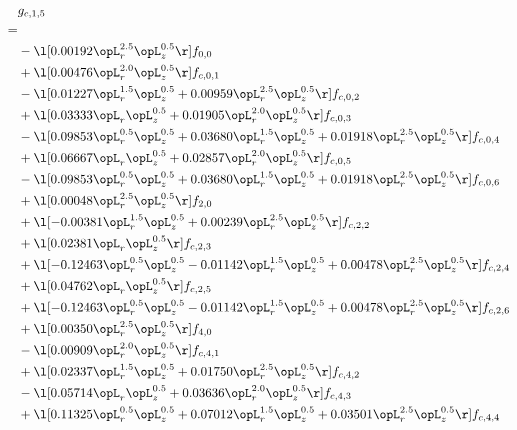 \begin{alignat}{2} 
\label{eq:g_15_0} 
& g_{c,1,5} \nonumber \\ 
 = \\ 
& - \l[  0.00192 \opL_r^{2.5} \opL_z^{0.5}  \r] f_{0,0} \nonumber \\ 
& + \l[  0.00476 \opL_r^{2.0} \opL_z^{0.5}  \r] f_{c,0,1} \nonumber \\ 
& - \l[  0.01227 \opL_r^{1.5} \opL_z^{0.5} +  0.00959 \opL_r^{2.5} \opL_z^{0.5}  \r] f_{c,0,2} \nonumber \\ 
& + \l[  0.03333 \opL_r \opL_z^{0.5} +  0.01905 \opL_r^{2.0} \opL_z^{0.5}  \r] f_{c,0,3} \nonumber \\ 
& - \l[  0.09853 \opL_r^{0.5} \opL_z^{0.5} +  0.03680 \opL_r^{1.5} \opL_z^{0.5} +  0.01918 \opL_r^{2.5} \opL_z^{0.5}  \r] f_{c,0,4} \nonumber \\ 
& + \l[  0.06667 \opL_r \opL_z^{0.5} +  0.02857 \opL_r^{2.0} \opL_z^{0.5}  \r] f_{c,0,5} \nonumber \\ 
& - \l[  0.09853 \opL_r^{0.5} \opL_z^{0.5} +  0.03680 \opL_r^{1.5} \opL_z^{0.5} +  0.01918 \opL_r^{2.5} \opL_z^{0.5}  \r] f_{c,0,6} \nonumber \\ 
& + \l[  0.00048 \opL_r^{2.5} \opL_z^{0.5}  \r] f_{2,0} \nonumber \\ 
& + \l[  -0.00381 \opL_r^{1.5} \opL_z^{0.5} +  0.00239 \opL_r^{2.5} \opL_z^{0.5}  \r] f_{c,2,2} \nonumber \\ 
& + \l[  0.02381 \opL_r \opL_z^{0.5}  \r] f_{c,2,3} \nonumber \\ 
& + \l[  -0.12463 \opL_r^{0.5} \opL_z^{0.5}   -0.01142 \opL_r^{1.5} \opL_z^{0.5} +  0.00478 \opL_r^{2.5} \opL_z^{0.5}  \r] f_{c,2,4} \nonumber \\ 
& + \l[  0.04762 \opL_r \opL_z^{0.5}  \r] f_{c,2,5} \nonumber \\ 
& + \l[  -0.12463 \opL_r^{0.5} \opL_z^{0.5}   -0.01142 \opL_r^{1.5} \opL_z^{0.5} +  0.00478 \opL_r^{2.5} \opL_z^{0.5}  \r] f_{c,2,6} \nonumber \\ 
& + \l[  0.00350 \opL_r^{2.5} \opL_z^{0.5}  \r] f_{4,0} \nonumber \\ 
& - \l[  0.00909 \opL_r^{2.0} \opL_z^{0.5}  \r] f_{c,4,1} \nonumber \\ 
& + \l[  0.02337 \opL_r^{1.5} \opL_z^{0.5} +  0.01750 \opL_r^{2.5} \opL_z^{0.5}  \r] f_{c,4,2} \nonumber \\ 
& - \l[  0.05714 \opL_r \opL_z^{0.5} +  0.03636 \opL_r^{2.0} \opL_z^{0.5}  \r] f_{c,4,3} \nonumber \\ 
& + \l[  0.11325 \opL_r^{0.5} \opL_z^{0.5} +  0.07012 \opL_r^{1.5} \opL_z^{0.5} +  0.03501 \opL_r^{2.5} \opL_z^{0.5}  \r] f_{c,4,4} \nonumber \\ 

\end{alignat}
